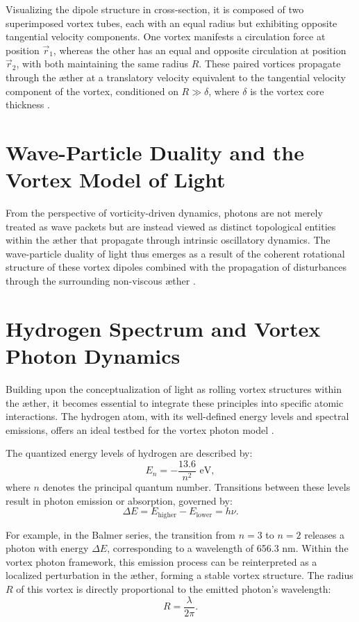 Visualizing the dipole structure in cross-section, it is composed of two superimposed vortex tubes, each with an equal radius but exhibiting opposite tangential velocity components. One vortex manifests a circulation force at position $\vec{r}_1$, whereas the other has an equal and opposite circulation at position $\vec{r}_2$, with both maintaining the same radius $R$. These paired vortices propagate through the \ae ther at a translatory velocity equivalent to the tangential velocity component of the vortex, conditioned on $R \gg \delta$, where $\delta$ is the vortex core thickness \cite{meunier2005}.

\section{Wave-Particle Duality and the Vortex Model of Light}
From the perspective of vorticity-driven dynamics, photons are not merely treated as wave packets but are instead viewed as distinct topological entities within the \ae ther that propagate through intrinsic oscillatory dynamics. The wave-particle duality of light thus emerges as a result of the coherent rotational structure of these vortex dipoles combined with the propagation of disturbances through the surrounding non-viscous \ae ther \cite{kleckner2016, orlandi2021}.

\section{Hydrogen Spectrum and Vortex Photon Dynamics}
Building upon the conceptualization of light as rolling vortex structures within the \ae ther, it becomes essential to integrate these principles into specific atomic interactions. The hydrogen atom, with its well-defined energy levels and spectral emissions, offers an ideal testbed for the vortex photon model \cite{maxwell1861, clausius1865}.

The quantized energy levels of hydrogen are described by:
\begin{equation}
E_n = -\frac{13.6}{n^2} \text{ eV},
\end{equation}
where $n$ denotes the principal quantum number. Transitions between these levels result in photon emission or absorption, governed by:
\begin{equation}
\Delta E = E_{\text{higher}} - E_{\text{lower}} = h \nu.
\end{equation}

For example, in the Balmer series, the transition from $n=3$ to $n=2$ releases a photon with energy $\Delta E$, corresponding to a wavelength of 656.3 nm. Within the vortex photon framework, this emission process can be reinterpreted as a localized perturbation in the \ae ther, forming a stable vortex structure. The radius $R$ of this vortex is directly proportional to the emitted photon’s wavelength:
\begin{equation}
R = \frac{\lambda}{2\pi}.
\end{equation}

